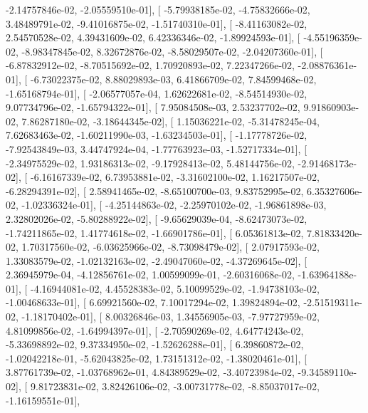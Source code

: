 \documentclass{article}
\begin{document}
         -2.14757846e-02,  -2.05559510e-01],
       [ -5.79938185e-02,  -4.75832666e-02,   3.48489791e-02,
         -9.41016875e-02,  -1.51740310e-01],
       [ -8.41163082e-02,   2.54570528e-02,   4.39431609e-02,
          6.42336346e-02,  -1.89924593e-01],
       [ -4.55196359e-02,  -8.98347845e-02,   8.32672876e-02,
         -8.58029507e-02,  -2.04207360e-01],
       [ -6.87832912e-02,  -8.70515692e-02,   1.70920893e-02,
          7.22347266e-02,  -2.08876361e-01],
       [ -6.73022375e-02,   8.88029893e-03,   6.41866709e-02,
          7.84599468e-02,  -1.65168794e-01],
       [ -2.06577057e-04,   1.62622681e-02,  -8.54514930e-02,
          9.07734796e-02,  -1.65794322e-01],
       [  7.95084508e-03,   2.53237702e-02,   9.91860903e-02,
          7.86287180e-02,  -3.18644345e-02],
       [  1.15036221e-02,  -5.31478245e-04,   7.62683463e-02,
         -1.60211990e-03,  -1.63234503e-01],
       [ -1.17778726e-02,  -7.92543849e-03,   3.44747924e-04,
         -1.77763923e-03,  -1.52717334e-01],
       [ -2.34975529e-02,   1.93186313e-02,  -9.17928413e-02,
          5.48144756e-02,  -2.91468173e-02],
       [ -6.16167339e-02,   6.73953881e-02,  -3.31602100e-02,
          1.16217507e-02,  -6.28294391e-02],
       [  2.58941465e-02,  -8.65100700e-03,   9.83752995e-02,
          6.35327606e-02,  -1.02336324e-01],
       [ -4.25144863e-02,  -2.25970102e-02,  -1.96861898e-03,
          2.32802026e-02,  -5.80288922e-02],
       [ -9.65629039e-04,  -8.62473073e-02,  -1.74211865e-02,
          1.41774618e-02,  -1.66901786e-01],
       [  6.05361813e-02,   7.81833420e-02,   1.70317560e-02,
         -6.03625966e-02,  -8.73098479e-02],
       [  2.07917593e-02,   1.33083579e-02,  -1.02132163e-02,
         -2.49047060e-02,  -4.37269645e-02],
       [  2.36945979e-04,  -4.12856761e-02,   1.00599099e-01,
         -2.60316068e-02,  -1.63964188e-01],
       [ -4.16944081e-02,   4.45528383e-02,   5.10099529e-02,
         -1.94738103e-02,  -1.00468633e-01],
       [  6.69921560e-02,   7.10017294e-02,   1.39824894e-02,
         -2.51519311e-02,  -1.18170402e-01],
       [  8.00326846e-03,   1.34556905e-03,  -7.97727959e-02,
          4.81099856e-02,  -1.64994397e-01],
       [ -2.70590269e-02,   4.64774243e-02,  -5.33698892e-02,
          9.37334950e-02,  -1.52626288e-01],
       [  6.39860872e-02,  -1.02042218e-01,  -5.62043825e-02,
          1.73151312e-02,  -1.38020461e-01],
       [  3.87761739e-02,  -1.03768962e-01,   4.84389529e-02,
         -3.40723984e-02,  -9.34589110e-02],
       [  9.81723831e-02,   3.82426106e-02,  -3.00731778e-02,
         -8.85037017e-02,  -1.16159551e-01],
\end{document}

